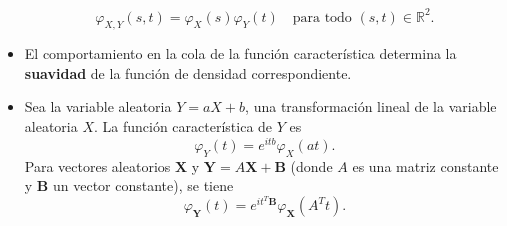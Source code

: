 \begin{itemize}
    \[
    \varphi_{X,Y}(s,t) = \varphi_X(s) \varphi_Y(t) \quad \text{para todo } (s,t) \in \mathbb{R}^2.
    \]
    \item El comportamiento en la cola de la función característica determina la \textbf{suavidad} de la función de densidad correspondiente.
    \item Sea la variable aleatoria $Y = aX + b$, una transformación lineal de la variable aleatoria $X$. La función característica de $Y$ es
    \[
    \varphi_Y(t) = e^{itb} \varphi_X(at).
    \]
    Para vectores aleatorios $\mathbf{X}$ y $\mathbf{Y} = A\mathbf{X} + \mathbf{B}$ (donde $A$ es una matriz constante y $\mathbf{B}$ un vector constante), se tiene
    \[
    \varphi_{\mathbf{Y}}(t) = e^{i t^T \mathbf{B}} \varphi_{\mathbf{X}}(A^T t).
    \]
\end{itemize}


